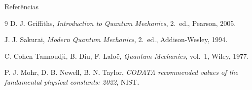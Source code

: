 \begin{frame}{Referências}
  \small
  \begin{thebibliography}{9}
      D. J. Griffiths,
      \emph{Introduction to Quantum Mechanics},
      2.\ ed., Pearson, 2005.

      J. J. Sakurai,
      \emph{Modern Quantum Mechanics},
      2.\ ed., Addison-Wesley, 1994.

      C. Cohen-Tannoudji, B. Diu, F. Laloë,
      \emph{Quantum Mechanics}, vol.\ 1, Wiley, 1977.

      P. J. Mohr, D. B. Newell, B. N. Taylor,
      \emph{CODATA recommended values of the fundamental physical
      constants: 2022}, NIST.
  \end{thebibliography}
\end{frame}
